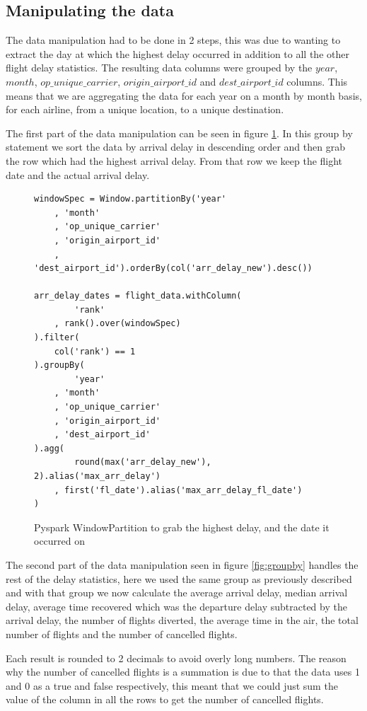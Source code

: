 \subsection{Manipulating the data}
The data manipulation had to be done in 2 steps, this was due to wanting to extract the day at which the highest delay occurred in addition to all the other flight delay statistics. The resulting data columns were grouped by the $year$, $month$, $op\_unique\_carrier$, $origin\_airport\_id$ and $dest\_airport\_id$ columns. This means that we are aggregating the data for each year on a month by month basis, for each airline, from a unique location, to a unique destination. 

The first part of the data manipulation can be seen in figure \ref{fig:windowpartition}. In this group by statement we sort the data by arrival delay in descending order and then grab the row which had the highest arrival delay. From that row we keep the flight date and the actual arrival delay.

\begin{figure}[H]
\centering
\begin{lstlisting}
windowSpec = Window.partitionBy('year'
    , 'month'
    , 'op_unique_carrier'
    , 'origin_airport_id'
    , 'dest_airport_id').orderBy(col('arr_delay_new').desc())

arr_delay_dates = flight_data.withColumn(
		'rank'
	, rank().over(windowSpec)
).filter(
	col('rank') == 1
).groupBy(
		'year'
	, 'month'
	, 'op_unique_carrier'
	, 'origin_airport_id'
	, 'dest_airport_id'
).agg(
		round(max('arr_delay_new'), 2).alias('max_arr_delay')
	, first('fl_date').alias('max_arr_delay_fl_date')
)
\end{lstlisting}
\caption{Pyspark WindowPartition to grab the highest delay, and the date it occurred on}
\label{fig:windowpartition}
\end{figure}

The second part of the data manipulation seen in figure \ref{fig:groupby} handles the rest of the delay statistics, here we used the same group as previously described and with that group we now calculate the average arrival delay, median arrival delay, average time recovered which was the departure delay subtracted by the arrival delay, the number of flights diverted, the average time in the air, the total number of flights and the number of cancelled flights.

Each result is rounded to 2 decimals to avoid overly long numbers. The reason why the number of cancelled flights is a summation is due to that the data uses 1 and 0 as a true and false respectively, this meant that we could just sum the value of the column in all the rows to get the number of cancelled flights.

